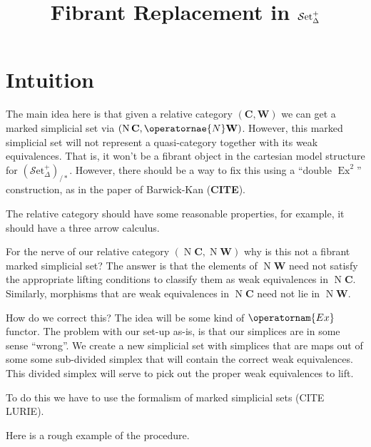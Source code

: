 \documentclass[english]{amsart}
\title{Fibrant Replacement in $\sset^+$}
\author{}
\date{}
\newcommand{\mc}{\mathcal}
\newcommand{\mbf}{\mathbf}
\newcommand{\sset}{\mc{S}\text{et}_\Delta}
\theoremstyle{definition}
\begin{document}
\maketitle
\tableofcontents


\section{Intuition}


The main idea here is that given a relative category $(\mbf{C},\mbf{W})$ we can get a marked simplicial set via $(\operatorname{N}\mbf{C},\operatornae{N}\mbf{W})$. However, this marked simplicial set will not represent a quasi-category together with its weak equivalences. That is, it won't be a fibrant object in the cartesian model structure for $(\sset^+)_{/\ast}$.  However, there should be a way to fix this using a ``double $\operatorname{Ex}^2$'' construction, as in the paper of Barwick-Kan (\textbf{CITE}). 

The relative category should have some reasonable properties, for example, it should have a three arrow calculus. 

For the nerve of our relative category $(\operatorname{N}\mbf{C},\operatorname{N}\mbf{W})$ why is this not a fibrant marked simplicial set? The answer is that the elements of $\operatorname{N}\mbf{W}$ need not satisfy the appropriate lifting conditions to classify them as weak equivalences in $\operatorname{N}\mbf{C}$. Similarly, morphisms that are weak equivalences in $\operatorname{N}\mbf{C}$ need not lie in $\operatorname{N}\mbf{W}$. 

How do we correct this? The idea will be some kind of $\operatornam{Ex}$ functor. The problem with our set-up as-is, is that our simplices are in some sense ``wrong''. We create a new simplicial set with simplices that are maps out of some some sub-divided simplex that will contain the correct weak equivalences. This divided simplex will serve to pick out the proper weak equivalences to lift. 

To do this we have to use the formalism of marked simplicial sets (CITE LURIE).

Here is a rough example of the procedure. 
\end{document}

